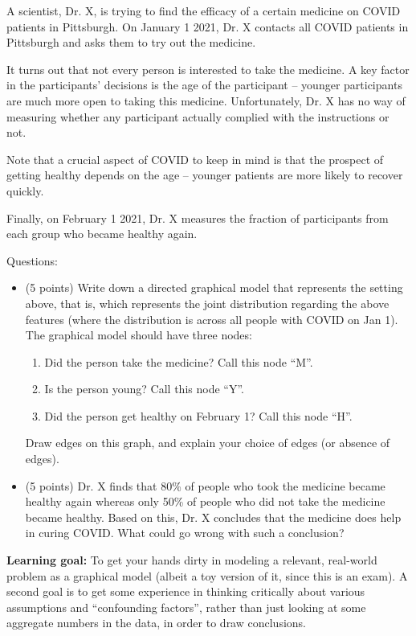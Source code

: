 A scientist, Dr. X, is trying to find the efficacy of a certain medicine on COVID patients in Pittsburgh. On January 1 2021, Dr. X contacts all COVID patients in Pittsburgh and asks them to try out the medicine. 



It turns out that not every person is interested to take the medicine. A key factor in the participants' decisions is the age of the participant -- younger participants are much more open to taking this medicine. Unfortunately, Dr. X has no way of measuring whether any participant actually complied with the instructions or not.

Note that a crucial aspect of COVID to keep in mind is that the prospect of getting healthy depends on the age -- younger patients are more likely to recover quickly.

Finally, on February 1 2021, Dr. X measures the fraction of participants from each group who became healthy again. 

Questions:
\begin{itemize}[(a)]
\item (5 points) Write down a directed graphical model that represents the setting above, that is, which represents the joint distribution regarding the above features (where the distribution is across all people with COVID on Jan 1). The graphical model should have three nodes:
\begin{enumerate}
    \item Did the person take the medicine? Call this node ``M''.
    \item Is the person young? Call this node ``Y''.
    \item Did the person get healthy on February 1? Call this node ``H''.
\end{enumerate}
Draw edges on this graph, and explain your choice of edges (or absence of edges). 
\end{itemize}


\begin{itemize}[(b)]
\item (5 points) Dr. X finds that 80\% of people who took the medicine became healthy again whereas only 50\% of people who did not take the medicine became healthy. Based on this, Dr. X concludes that the medicine does help in curing COVID. What could go wrong with such a conclusion?
\end{itemize}

{\bf Learning goal:} To get your hands dirty in modeling a relevant, real-world problem as a graphical model (albeit a toy version of it, since this is an exam). A second goal is to get some experience in thinking critically about various assumptions and ``confounding factors'', rather than just looking at some aggregate numbers in the data, in order to draw conclusions.